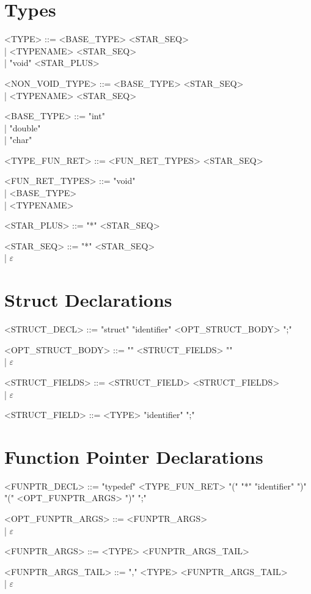 \section{Types}
\begin{grammar}
<TYPE> ::= <BASE\_TYPE> <STAR\_SEQ> \\
         | <TYPENAME> <STAR\_SEQ> \\
         | "void" <STAR\_PLUS>

<NON\_VOID\_TYPE> ::= <BASE\_TYPE> <STAR\_SEQ> \\
                    | <TYPENAME> <STAR\_SEQ>

<BASE\_TYPE> ::= "int" \\
               | "double" \\
               | "char"

<TYPE\_FUN\_RET> ::= <FUN\_RET\_TYPES> <STAR\_SEQ>

<FUN\_RET\_TYPES> ::= "void" \\
                    | <BASE\_TYPE> \\
                    | <TYPENAME>

<STAR\_PLUS> ::= "*" <STAR\_SEQ>

<STAR\_SEQ> ::= "*" <STAR\_SEQ> \\
              | $\varepsilon$
\end{grammar}

\section{Struct Declarations}
\begin{grammar}
<STRUCT\_DECL> ::= "struct" "identifier" <OPT\_STRUCT\_BODY> ";"

<OPT\_STRUCT\_BODY> ::= "{" <STRUCT\_FIELDS> "}" \\
                      | $\varepsilon$

<STRUCT\_FIELDS> ::= <STRUCT\_FIELD> <STRUCT\_FIELDS> \\
                   | $\varepsilon$

<STRUCT\_FIELD> ::= <TYPE> "identifier" ";"
\end{grammar}

\section{Function Pointer Declarations}
\begin{grammar}
<FUNPTR\_DECL> ::= "typedef" <TYPE\_FUN\_RET> "(" "*" "identifier" ")" "(" <OPT\_FUNPTR\_ARGS> ")" ";"

<OPT\_FUNPTR\_ARGS> ::= <FUNPTR\_ARGS> \\
                      | $\varepsilon$

<FUNPTR\_ARGS> ::= <TYPE> <FUNPTR\_ARGS\_TAIL>

<FUNPTR\_ARGS\_TAIL> ::= "," <TYPE> <FUNPTR\_ARGS\_TAIL> \\
                       | $\varepsilon$
\end{grammar}

